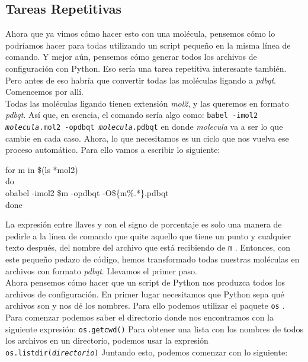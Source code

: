 \documentclass[10pt,letterpaper]{article}
\newcommand{\inlinecode}[1]{
\colorbox{light-gray}{\texttt{#1}}
}
\newenvironment{Code}
{
\begin{lrbox}{\selvestebox}%
\begin{minipage}{\dimexpr\columnwidth-2\fboxsep\relax}
\fontfamily{\ttdefault}\selectfont
}
{\end{minipage}\end{lrbox}%
\begin{center}
\colorbox{light-gray}{\usebox{\selvestebox}}
\end{center}
}
\begin{document}
\subsection{Tareas Repetitivas}

Ahora que ya vimos c\'omo hacer esto con una mol\'ecula, pensemos c\'omo lo podr\'iamos hacer para todas utilizando un script peque\~no en la misma l\'inea de comando. Y mejor a\'un, pensemos c\'omo generar todos los archivos de configuraci\'on con Python. Eso ser\'ia una tarea repetitiva interesante tambi\'en. Pero antes de eso habr\'ia que convertir todas las mol\'eculas ligando a \emph{pdbqt}. Comencemos por all\'i.\\

Todas las mol\'eculas ligando tienen extensi\'on \emph{mol2}, y las queremos en formato \emph{pdbqt}. As\'i que, en esencia, el comando ser\'ia algo como: \inlinecode{babel -imol2 \emph{molecula}.mol2 -opdbqt \emph{molecula}.pdbqt} en donde \emph{molecula} va a ser lo que cambie en cada caso. Ahora, lo que necesitamos es un ciclo que nos vuelva ese proceso autom\'atico. Para ello vamos a escribir lo siguiente:

\begin{Code}
for m in \$(ls *mol2)\\
do\\
obabel -imol2 \$m -opdbqt -O\$\{m\%.*\}.pdbqt\\
done
\end{Code}

La expresi\'on entre llaves y con el signo de porcentaje es solo una manera de pedirle a la l\'inea de comando que quite aquello que tiene un punto y cualquier texto despu\'es, del nombre del archivo que est\'a recibiendo de \inlinecode{m}. Entonces, con este peque\~no pedazo de c\'odigo, hemos transformado todas nuestras mol\'eculas en archivos con formato \emph{pdbqt}. Llevamos el primer paso.\\

Ahora pensemos c\'omo hacer que un script de Python nos produzca todos los archivos de configuraci\'on. En primer lugar necesitamos que Python sepa qu\'e archivos son y nos d\'e los nombres. Para ello podemos utilizar el paquete \inlinecode{os}. Para comenzar podemos saber el directorio donde nos encontramos con la siguiente expresi\'on: \inlinecode{os.getcwd()} Para obtener una lista con los nombres de todos los archivos en un directorio, podemos usar la expresi\'on \inlinecode{os.listdir(\emph{directorio})} Juntando esto, podemos comenzar con lo siguiente:
\end{document}
